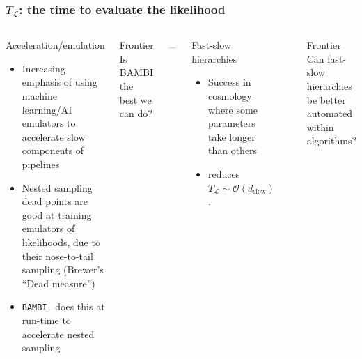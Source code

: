 \documentclass[aspectratio=169]{beamer}
\begin{document}
\begin{frame}
    \frametitle{$T_\mathcal{L}$: the time to evaluate the likelihood}
    \begin{columns}
        \begin{block}{Acceleration/emulation}
            \begin{itemize}
                \item Increasing emphasis of using machine learning/AI emulators to accelerate slow components of pipelines
                \item Nested sampling dead points are good at training emulators of likelihoods, due to their nose-to-tail sampling (Brewer's ``Dead measure'')
                \item \texttt{BAMBI}~ does this at run-time to accelerate nested sampling
            \end{itemize}
        \end{block}
        \begin{alertblock}{Frontier}
            Is BAMBI the best we can do?
        \end{alertblock}
        \includegraphics[angle=-90,width=\textwidth]{figures/dead_measure}
        \begin{block}{Fast-slow hierarchies}
            \begin{itemize}
                \item Success in cosmology where some parameters take longer than others
                \item reduces $T_\mathcal{L}\sim\mathcal{O}(d_\text{slow})$.
            \end{itemize}
        \end{block}
        \includegraphics[width=\textwidth]{figures/fast_slow.pdf}
        \begin{alertblock}{Frontier}
            Can fast-slow hierarchies be better automated within algorithms?
        \end{alertblock}
    \end{columns}
\end{frame}
\end{document}
